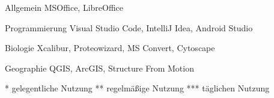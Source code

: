 

\begin{cvpairs}

  
\cvpair
    {Allgemein} %
    {MSOffice, LibreOffice} %

  
\cvpair
    {Programmierung} %
    {Visual Studio Code, IntelliJ Idea, Android Studio} %

  
\cvpair
    {Biologie} %
    {Xcalibur, Proteowizard, MS Convert, Cytoscape} %

  
\cvpair
    {Geographie} %
    {QGIS, ArcGIS, Structure From Motion} %

\end{cvpairs}

{\color{red}\footnotesize
* gelegentliche Nutzung \quad
** regelmäßige Nutzung \quad
*** täglichen Nutzung
}